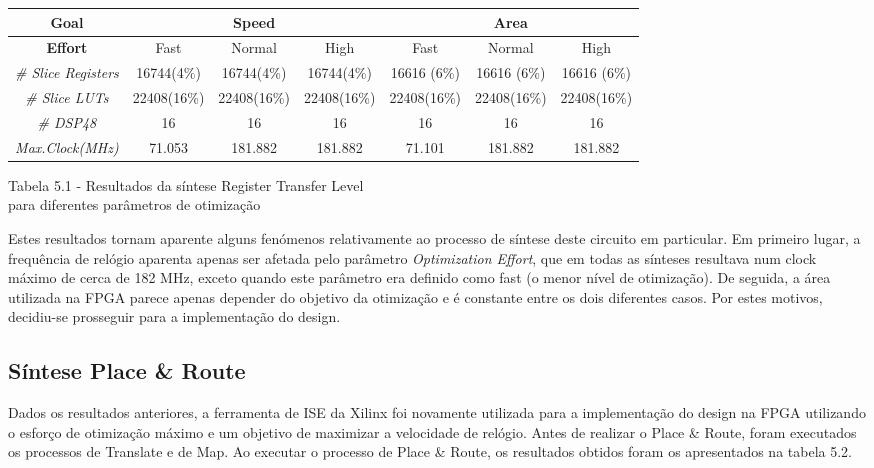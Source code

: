 \documentclass[10pt,twoside]{article}
\begin{document}
\begin{center}
	\begin{tabular}{| c || c | c | c | c | c | c |}
	\hline
	\textbf{Goal} & \multicolumn{3}{c|}{Speed} & \multicolumn{3}{c|}{Area} \\ 
	\hline
	\textbf{Effort} & Fast & Normal & High & Fast & Normal & High \\
	\hline %
	\textit{\# Slice Registers} & 16744(4\%) & 16744(4\%) & 16744(4\%) & 16616 (6\%) & 16616 (6\%) & 16616 (6\%) \\
	\textit{\# Slice LUTs} & 22408(16\%) & 22408(16\%) & 22408(16\%) & 22408(16\%) & 22408(16\%) & 22408(16\%) \\
	\textit{\# DSP48} & 16 & 16 & 16 & 16 & 16 & 16\\
	\textit{Max.Clock(MHz)} & 71.053 & 181.882 & 181.882 & 71.101 & 181.882 & 181.882\\

	\hline
	\end{tabular}

	\vspace{5pt}

	Tabela 5.1 - Resultados da síntese Register Transfer Level \\para diferentes parâmetros de otimização
\end{center}

Estes resultados tornam aparente alguns fenómenos relativamente ao processo de síntese deste circuito em particular. Em primeiro lugar, a frequência de relógio aparenta apenas ser afetada pelo parâmetro \textit{Optimization Effort}, que em todas as sínteses resultava num clock máximo de cerca de 182 MHz, exceto quando este parâmetro era definido como fast (o menor nível de otimização). De seguida, a área utilizada na FPGA parece apenas depender do objetivo da otimização e é constante entre os dois diferentes casos. Por estes motivos, decidiu-se prosseguir para a implementação do design.
	
\subsection{Síntese Place \& Route}

Dados os resultados anteriores, a ferramenta de ISE da Xilinx foi novamente utilizada para a implementação do design na FPGA utilizando o esforço de otimização máximo e um objetivo de maximizar a velocidade de relógio. Antes de realizar o Place \& Route, foram executados os processos de Translate e de Map. Ao executar o processo de Place \& Route, os resultados obtidos foram os apresentados na tabela 5.2.
\end{document}
